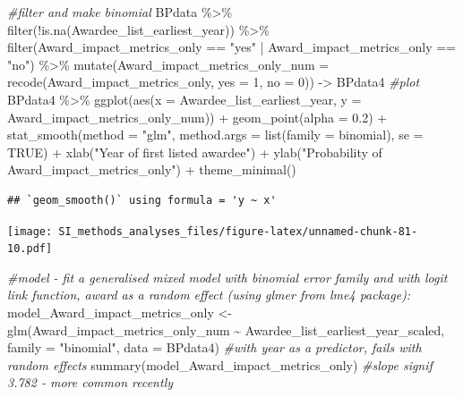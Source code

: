\documentclass[
]{article}
\newenvironment{Shaded}{\begin{snugshade}}{\end{snugshade}}
\newcommand{\AttributeTok}[1]{\textcolor[rgb]{0.77,0.63,0.00}{#1}}
\newcommand{\CommentTok}[1]{\textcolor[rgb]{0.56,0.35,0.01}{\textit{#1}}}
\newcommand{\ConstantTok}[1]{\textcolor[rgb]{0.00,0.00,0.00}{#1}}
\newcommand{\DecValTok}[1]{\textcolor[rgb]{0.00,0.00,0.81}{#1}}
\newcommand{\FloatTok}[1]{\textcolor[rgb]{0.00,0.00,0.81}{#1}}
\newcommand{\FunctionTok}[1]{\textcolor[rgb]{0.00,0.00,0.00}{#1}}
\newcommand{\NormalTok}[1]{#1}
\newcommand{\OtherTok}[1]{\textcolor[rgb]{0.56,0.35,0.01}{#1}}
\newcommand{\SpecialCharTok}[1]{\textcolor[rgb]{0.00,0.00,0.00}{#1}}
\newcommand{\StringTok}[1]{\textcolor[rgb]{0.31,0.60,0.02}{#1}}
\begin{document}
\begin{Shaded}
\begin{Highlighting}[]
\CommentTok{\#filter and make binomial }
\NormalTok{BPdata }\SpecialCharTok{\%\textgreater{}\%} 
  \FunctionTok{filter}\NormalTok{(}\SpecialCharTok{!}\FunctionTok{is.na}\NormalTok{(Awardee\_list\_earliest\_year)) }\SpecialCharTok{\%\textgreater{}\%} 
  \FunctionTok{filter}\NormalTok{(Award\_impact\_metrics\_only }\SpecialCharTok{==} \StringTok{"yes"} \SpecialCharTok{|}\NormalTok{ Award\_impact\_metrics\_only }\SpecialCharTok{==} \StringTok{"no"}\NormalTok{) }\SpecialCharTok{\%\textgreater{}\%}  
  \FunctionTok{mutate}\NormalTok{(}\AttributeTok{Award\_impact\_metrics\_only\_num =} \FunctionTok{recode}\NormalTok{(Award\_impact\_metrics\_only, }\AttributeTok{yes =} \DecValTok{1}\NormalTok{, }\AttributeTok{no =} \DecValTok{0}\NormalTok{)) }\OtherTok{{-}\textgreater{}}\NormalTok{ BPdata4}
\CommentTok{\#plot}
\NormalTok{BPdata4 }\SpecialCharTok{\%\textgreater{}\%} 
  \FunctionTok{ggplot}\NormalTok{(}\FunctionTok{aes}\NormalTok{(}\AttributeTok{x =}\NormalTok{ Awardee\_list\_earliest\_year, }\AttributeTok{y =}\NormalTok{ Award\_impact\_metrics\_only\_num)) }\SpecialCharTok{+} 
  \FunctionTok{geom\_point}\NormalTok{(}\AttributeTok{alpha =} \FloatTok{0.2}\NormalTok{) }\SpecialCharTok{+} 
  \FunctionTok{stat\_smooth}\NormalTok{(}\AttributeTok{method =} \StringTok{"glm"}\NormalTok{, }\AttributeTok{method.args =} \FunctionTok{list}\NormalTok{(}\AttributeTok{family =}\NormalTok{ binomial), }\AttributeTok{se =} \ConstantTok{TRUE}\NormalTok{) }\SpecialCharTok{+}
  \FunctionTok{xlab}\NormalTok{(}\StringTok{"Year of first listed awardee"}\NormalTok{) }\SpecialCharTok{+} 
  \FunctionTok{ylab}\NormalTok{(}\StringTok{"Probability of Award\_impact\_metrics\_only"}\NormalTok{) }\SpecialCharTok{+}
  \FunctionTok{theme\_minimal}\NormalTok{() }
\end{Highlighting}
\end{Shaded}

\begin{verbatim}
## `geom_smooth()` using formula = 'y ~ x'
\end{verbatim}

\texttt{[image: SI\_methods\_analyses\_files/figure-latex/unnamed-chunk-81-10.pdf]}

\begin{Shaded}
\begin{Highlighting}[]
\CommentTok{\#model {-} fit a generalised mixed model with binomial error family and with logit link function, award as a random effect (using glmer from lme4 package):}
\NormalTok{model\_Award\_impact\_metrics\_only }\OtherTok{\textless{}{-}} \FunctionTok{glm}\NormalTok{(Award\_impact\_metrics\_only\_num }\SpecialCharTok{\textasciitilde{}}\NormalTok{ Awardee\_list\_earliest\_year\_scaled, }\AttributeTok{family =} \StringTok{"binomial"}\NormalTok{, }\AttributeTok{data =}\NormalTok{ BPdata4) }\CommentTok{\#with year as a predictor, fails with random effects}
\FunctionTok{summary}\NormalTok{(model\_Award\_impact\_metrics\_only) }\CommentTok{\#slope signif 3.782 {-} more common recently}
\end{Highlighting}
\end{Shaded}
\end{document}
